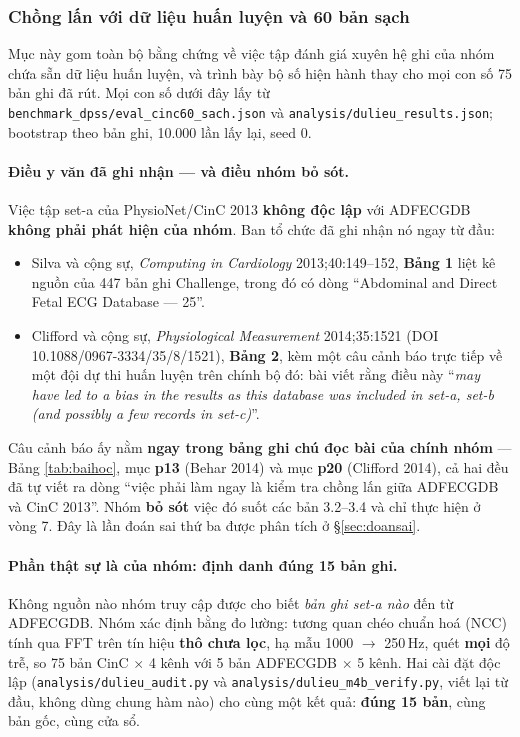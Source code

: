 \subsubsection{Chồng lấn với dữ liệu huấn luyện và 60 bản sạch}
\label{sec:cinc60}

Mục này gom toàn bộ bằng chứng về việc tập đánh giá xuyên hệ ghi của nhóm chứa sẵn dữ liệu huấn luyện,
và trình bày bộ số hiện hành thay cho mọi con số 75 bản ghi đã rút. Mọi con số dưới đây lấy từ
\texttt{benchmark\_dpss/eval\_cinc60\_sach.json} và \texttt{analysis/dulieu\_results.json}; bootstrap
theo bản ghi, 10.000 lần lấy lại, seed 0.

\paragraph{Điều y văn đã ghi nhận --- và điều nhóm bỏ sót.}
Việc tập set-a của PhysioNet/CinC 2013 \textbf{không độc lập} với ADFECGDB \textbf{không phải phát hiện
của nhóm}. Ban tổ chức đã ghi nhận nó ngay từ đầu:

\begin{itemize}[leftmargin=1.6em,itemsep=3pt]
\item Silva và cộng sự, \textit{Computing in Cardiology} 2013;40:149--152, \textbf{Bảng 1} liệt kê
nguồn của 447 bản ghi Challenge, trong đó có dòng ``Abdominal and Direct Fetal ECG Database --- 25''.
\item Clifford và cộng sự, \textit{Physiological Measurement} 2014;35:1521
(DOI 10.1088/0967-3334/35/8/1521), \textbf{Bảng 2}, kèm một câu cảnh báo trực tiếp về một đội dự thi
huấn luyện trên chính bộ đó: bài viết rằng điều này ``\textit{may have led to a bias in the results as
this database was included in set-a, set-b (and possibly a few records in set-c)}''.
\end{itemize}

Câu cảnh báo ấy nằm \textbf{ngay trong bảng ghi chú đọc bài của chính nhóm} --- Bảng
\ref{tab:baihoc}, mục \textbf{p13} (Behar 2014) và mục \textbf{p20} (Clifford 2014), cả hai đều đã tự
viết ra dòng ``việc phải làm ngay là kiểm tra chồng lấn giữa ADFECGDB và CinC 2013''. Nhóm
\textbf{bỏ sót} việc đó suốt các bản 3.2--3.4 và chỉ thực hiện ở vòng 7. Đây là lần đoán sai thứ ba
được phân tích ở \S\ref{sec:doansai}.

\paragraph{Phần thật sự là của nhóm: định danh đúng 15 bản ghi.}
Không nguồn nào nhóm truy cập được cho biết \emph{bản ghi set-a nào} đến từ ADFECGDB. Nhóm xác định
bằng đo lường: tương quan chéo chuẩn hoá (NCC) tính qua FFT trên tín hiệu \textbf{thô chưa lọc}, hạ mẫu
1000 $\to$ 250\,Hz, quét \textbf{mọi} độ trễ, so 75 bản CinC $\times$ 4 kênh với 5 bản ADFECGDB
$\times$ 5 kênh. Hai cài đặt độc lập (\texttt{analysis/dulieu\_audit.py} và
\texttt{analysis/dulieu\_m4b\_verify.py}, viết lại từ đầu, không dùng chung hàm nào) cho cùng một kết
quả: \textbf{đúng 15 bản}, cùng bản gốc, cùng cửa sổ.


